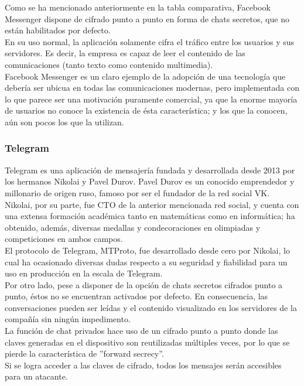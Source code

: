 Como se ha mencionado anteriormente en la tabla comparativa, Facebook Messenger dispone de cifrado punto a punto en forma de chats secretos, que no están habilitados por defecto. \\
En su uso normal, la aplicación solamente cifra el tráfico entre los usuarios y sus servidores. Es decir, la empresa es capaz de leer el contenido de las comunicaciones (tanto texto como contenido multimedia). \\

Facebook Messenger es un claro ejemplo de la adopción de una tecnología que debería ser ubicua en todas las comunicaciones modernas, pero implementada con lo que parece ser una motivación puramente comercial, ya que la enorme mayoría de usuarios no conoce la existencia de ésta característica; y los que la conocen, aún son pocos los que la utilizan. \\

\subsubsection {Telegram}

Telegram es una aplicación de mensajería fundada y desarrollada desde 2013 por los hermanos Nikolai y Pavel Durov. Pavel Durov es un conocido emprendedor y millonario de origen ruso, famoso por ser el fundador de la red social VK. \\ 

Nikolai, por su parte, fue CTO de la anterior mencionada red social, y cuenta con una extensa formación académica tanto en matemáticas como en informática; ha obtenido, además, diversas medallas y condecoraciones en olimpiadas y competiciones en ambos campos. \\

El protocolo de Telegram, MTProto, fue desarrollado desde cero por Nikolai, lo cual ha ocasionado diversas dudas respecto a su seguridad y fiabilidad para un uso en producción en la escala de Telegram. \\

Por otro lado, pese a disponer de la opción de chats secretos cifrados punto a punto, éstos no se encuentran activados por defecto. En consecuencia, las conversaciones pueden ser leídas y el contenido visualizado en los servidores de la compañía sin ningún impedimento. \\

La función de chat privados hace uso de un cifrado punto a punto donde las claves generadas en el dispositivo son reutilizadas múltiples veces, por lo que se pierde la característica de ''forward secrecy''. \\ Si se logra acceder a las claves de cifrado, todos los mensajes serán accesibles para un atacante. \\
